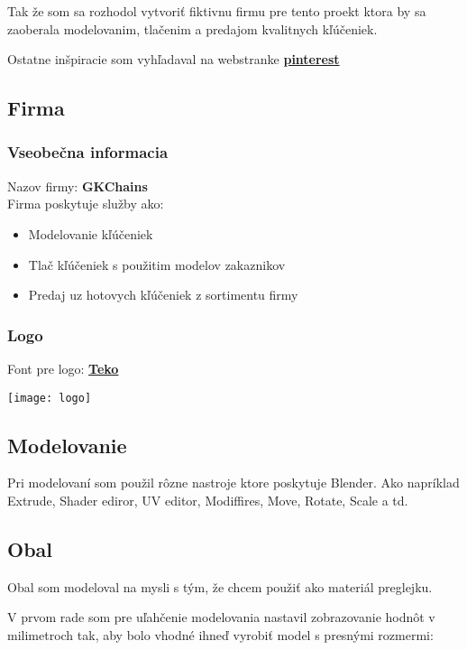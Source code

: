       Tak že som sa rozhodol vytvoriť fiktivnu firmu pre tento proekt ktora by sa zaoberala modelovanim, tlačenim a predajom kvalitnych kľúčeniek.

      Ostatne inšpiracie som vyhľadaval na webstranke \textbf{\href{https://pinterest.com}{pinterest}}

    \subsection{Firma}
      \subsubsection{Vseobečna informacia}
      Nazov firmy: \textbf{GKChains} \\
      Firma poskytuje služby ako:
      \begin{itemize}
        \item{Modelovanie kľúčeniek}
        \item{Tlač kľúčeniek s použitim modelov zakaznikov}
        \item{Predaj uz hotovych kľúčeniek z sortimentu firmy}
      \end{itemize}
      \subsubsection{Logo}
      Font pre logo: \textbf{\href{https://fonts.google.com/specimen/Teko?query=Teko}{Teko}}

      \begin{center}
        \texttt{[image: logo]}
      \end{center}

    \subsection{Modelovanie}
      Pri modelovaní som použil rôzne nastroje ktore poskytuje Blender. Ako napríklad Extrude, Shader ediror, UV editor, Modiffires, Move, Rotate, Scale a td.

      \subsection{Obal}
        Obal som modeloval na mysli s tým, že chcem použiť ako materiál preglejku.

        V prvom rade som pre uľahčenie modelovania nastavil zobrazovanie hodnôt v milimetroch tak, aby bolo vhodné ihneď vyrobiť model s presnými rozmermi: \\

